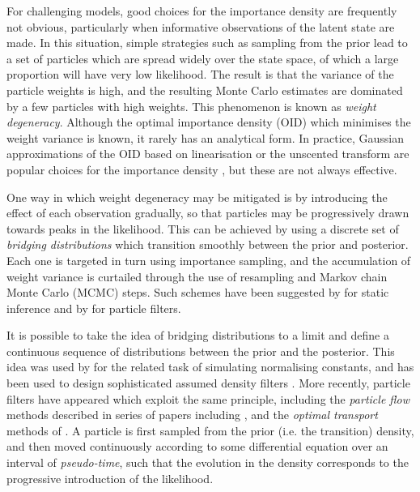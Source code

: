 \documentclass{article}
\begin{document}
For challenging models, good choices for the importance density are frequently not obvious, particularly when informative observations of the latent state are made. In this situation, simple strategies such as sampling from the prior lead to a set of particles which are spread widely over the state space, of which a large proportion will have very low likelihood. The result is that the variance of the particle weights is high, and the resulting Monte Carlo estimates are dominated by a few particles with high weights. This phenomenon is known as \emph{weight degeneracy}. Although the optimal importance density (OID) which minimises the weight variance is known, it rarely has an analytical form. In practice, Gaussian approximations of the OID based on linearisation or the unscented transform are popular choices for the importance density \citep{Doucet2000a,Merwe2000}, but these are not always effective.

One way in which weight degeneracy may be mitigated is by introducing the effect of each observation gradually, so that particles may be progressively drawn towards peaks in the likelihood. This can be achieved by using a discrete set of \emph{bridging distributions} which transition smoothly between the prior and posterior. Each one is targeted in turn using importance sampling, and the accumulation of weight variance is curtailed through the use of resampling and Markov chain Monte Carlo (MCMC) steps. Such schemes have been suggested by \citet{Neal2001,DelMoral2006} for static inference and by \citet{Godsill2001b,Gall2007,Deutscher2000,Oudjane2000} for particle filters.

It is possible to take the idea of bridging distributions to a limit and define a continuous sequence of distributions between the prior and the posterior. This idea was used by \citet{Gelman1998} for the related task of simulating normalising constants, and has been used to design sophisticated assumed density filters \citep{Hanebeck2003a,Hanebeck2012,Hagmar2011}. More recently, particle filters have appeared which exploit the same principle, including the \emph{particle flow} methods described in series of papers including \citep{Daum2008,Daum2011d}, and the \emph{optimal transport} methods of \cite{Reich2011,Reich2012a}. A particle is first sampled from the prior (i.e. the transition) density, and then moved continuously according to some differential equation over an interval of \emph{pseudo-time}, such that the evolution in the density corresponds to the progressive introduction of the likelihood.
\end{document}
